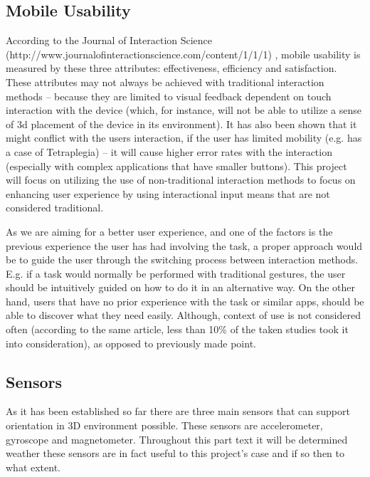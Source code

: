 \subsection{Mobile Usability}
According to the Journal of Interaction Science (http://www.journalofinteractionscience.com/content/1/1/1) , mobile usability is measured by these three attributes: effectiveness, efficiency and satisfaction. These attributes may not always be achieved with traditional interaction methods – because they are limited to visual feedback dependent on touch interaction with the device (which, for instance, will not be able to utilize a sense of 3d placement of the device in its environment). It has also been shown that it might conflict with the users interaction, if the user has limited mobility (e.g. has a case of Tetraplegia) – it will cause higher error rates with the interaction (especially with complex applications that have smaller buttons). This project will focus on utilizing the use of non-traditional interaction methods to focus on enhancing user experience by using interactional input means that are not considered traditional.

As we are aiming for a better user experience, and one of the factors is the previous experience the user has had involving the task, a proper approach would be to guide the user through the switching process between interaction methods. E.g. if a task would normally be performed with traditional gestures, the user should be intuitively guided on how to do it in an alternative way. On the other hand, users that have no prior experience with the task or similar apps, should be able to discover what they need easily. Although, context of use is not considered often (according to the same article, less than 10\% of the taken studies took it into consideration), as opposed to previously made point.

\subsection{Sensors} \label{sensors}

As it has been established so far there are three main sensors that can support orientation in 3D environment possible. These sensors are accelerometer, gyroscope and magnetometer. Throughout this part text it will be determined weather these sensors are in fact useful to this project's case and if so then to what extent.

